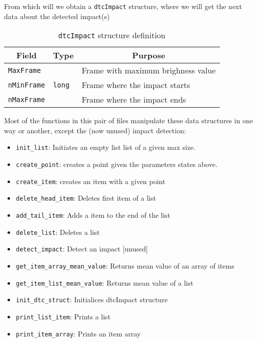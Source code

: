 \documentclass[a4paper,11pt]{memoir}
\begin{document}
From which will we obtain a \texttt{dtcImpact} structure, where we will get the next data about the detected impact(s)

\begin{table}[H]
\centering
\caption{\texttt{dtcImpact} structure definition}
\label{my-label}
\begin{tabular}{|m{}|m{}|m{}|}
\hline
\multicolumn{1}{|c|}{\textbf{Field}} & \multicolumn{1}{c|}{\textbf{Type}} & \multicolumn{1}{c|}{\textbf{Purpose}} \\ \hline
\texttt{MaxFrame} & \multirow{3}{*}{\texttt{long}} & Frame with maximum brighness value \\ \cline{1-1} \cline{3-3}
\texttt{nMinFrame} &  & Frame where the impact starts \\ \cline{1-1} \cline{3-3}
\texttt{nMaxFrame} &  & Frame where the impact ends \\ \hline
\end{tabular}
\end{table}

Most of the functions in this pair of files manipulate these data structures in one way or another, except the (now unused) impact detection:

\begin{itemize}
\item \texttt{init\_list}: Initiates an empty list list of a given max size.
\item \texttt{create\_point}: creates a point given the parameters states above.
\item \texttt{create\_item}: creates an item with a given point
\item \texttt{delete\_head\_item}: Deletes first item of a list
\item \texttt{add\_tail\_item}: Adds a item to the end of the list
\item \texttt{delete\_list}: Deletes a list
\item \texttt{detect\_impact}: Detect an impact [unused]
\item \texttt{get\_item\_array\_mean\_value}: Returns mean value of an array of items
\item \texttt{get\_item\_list\_mean\_value}: Returns mean value of a list
\item \texttt{init\_dtc\_struct}: Initialices dtcImpact structure
\item \texttt{print\_list\_item}: Prints a list
\item \texttt{print\_item\_array}: Prints an item array
\end{itemize}
\end{document}
